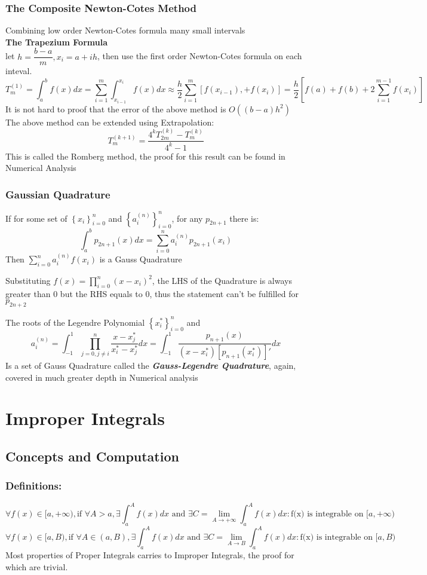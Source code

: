 \documentclass{article}
\newcommand{\0}{{\bf{0}}}
\begin{document}
\subsubsection{The Composite Newton-Cotes Method}
Combining low order Newton-Cotes formula many small intervals\\
\textbf{The Trapezium Formula}\\
let $h=\dfrac{b-a}{m},x_i=a+ih$, then use the first order Newton-Cotes formula on each inteval.
$$T_m^{(1)}=\int_a^bf(x)dx=\sum_{i=1}^m\int_{x_{i-1}}^{x_i}f(x)dx\approx{}\frac{h}{2}\sum_{i=1}^m\left[f(x_{i-1}),+f(x_i)\right]=\frac{h}{2}\left[f(a)+f(b)+2\sum_{i=1}^{m-1}f(x_i)\right]$$
It is not hard to proof that the error of the above method is $O((b-a)h^2)$\\
The above method can be extended using Extrapolation:
$$T_m^{(k+1)}=\frac{{4^k}T_{2m}^{(k)}-T_m^{(k)}}{4^k-1}$$
This is called the Romberg method, the proof for this result can be found in Numerical Analysis
\subsubsection{Gaussian Quadrature}
If for some set of $\left\{x_i\right\}_{i=0}^n$ and $\left\{a_i^{(n)}\right\}_{i=0}^n$, for any $p_{2n+1}$ there is:
$$\int_a^bp_{2n+1}(x)dx=\sum_{i=0}^na_i^{(n)}p_{2n+1}(x_i)$$
Then $\sum\limits_{i=0}^na_i^{(n)}f(x_i)$ is a Gauss Quadrature

Substituting $f(x)=\prod\limits_{i=0}^n(x-x_i)^2$, the LHS of the Quadrature is always greater than $0$ but the RHS equals to $0$, thus the statement can't be fulfilled for $p_{2n+2}$

The roots of the Legendre Polynomial $\left\{x_i^*\right\}_{i=0}^n$ and 
$$a_i^{(n)}=\int_{-1}^1\prod_{j=0,j\neq{}i}^n\frac{x-x_j^*}{x_i^*-x_j^*}dx=\int_{-1}^1\frac{p_{n+1}(x)}{(x-x_i^*)\left[p_{n+1}(x_i^*)\right]'}dx$$
Is a set of Gauss Quadrature called the {\textit{\textbf{Gauss-Legendre Quadrature}}}, again, covered in much greater depth in Numerical analysis
\section{Improper Integrals}
\subsection{Concepts and Computation}
\subsubsection{Definitions:}
$$\forall{}f(x)\in[a,+\infty),\mbox{if }\forall{}A>a,\exists\int_a^Af(x)dx\mbox{ and }\exists{}C=\lim_{A\to+\infty}\int_a^Af(x)dx:\mbox{f(x) is integrable on }[a,+\infty)$$
$$\forall{}f(x)\in[a,B),\mbox{if }\forall{}A\in(a,B),\exists\int_a^Af(x)dx\mbox{ and }\exists{}C=\lim_{A\to{}B}\int_a^Af(x)dx:\mbox{f(x) is integrable on }[a,B)$$
Most properties of Proper Integrals carries to Improper Integrals, the proof for which are trivial.
\end{document}
